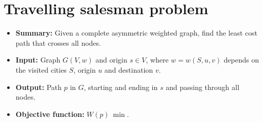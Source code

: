 \section{Travelling salesman problem} \label{algorithm-tsp}
\begin{itemize}
    \item \textbf{Summary:} Given a complete asymmetric weighted graph, find the least cost path that crosses all nodes. 
    \item \textbf{Input:} Graph $G(V,w)$ and origin $s \in V$, where $w=w(S, u, v)$ depends on the visited cities $S$, origin $u$ and destination $v$.
    \item \textbf{Output:} Path $p$ in $G$, starting and ending in $s$ and passing through all nodes.
    \item \textbf{Objective function:} $W(p)~\min$.
\end{itemize}


